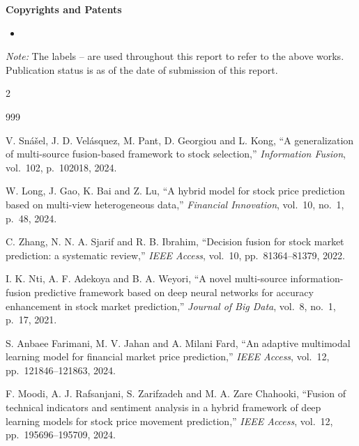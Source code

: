 \ifHasIPR
\textbf{Copyrights and Patents}

\begin{itemize}
\item \IPRentries
\end{itemize}
\fi

\vspace{0.4em}
\textit{Note:} The labels -- are used throughout this report to refer
to the above works. Publication status is as of the date of submission of this report.

\clearpage
\begin{footnotesize}
\setlength{\parskip}{0pt}
\setlength{\columnsep}{16pt}
\begin{multicols}{2}
\begin{thebibliography}{999}
\setlength{\itemsep}{1.5pt}\setlength{\parsep}{0pt}

 V. Sn\'a\v{s}el, J. D. Vel\'asquez, M. Pant, D. Georgiou and L. Kong,
``A generalization of multi-source fusion-based framework to stock selection,''
\emph{Information Fusion}, vol.~102, p.~102018, 2024.

 W. Long, J. Gao, K. Bai and Z. Lu, ``A hybrid model for stock price
prediction based on multi-view heterogeneous data,'' \emph{Financial Innovation}, vol.~10,
no.~1, p.~48, 2024.

 C. Zhang, N. N. A. Sjarif and R. B. Ibrahim, ``Decision fusion for
stock market prediction: a systematic review,'' \emph{IEEE Access}, vol.~10,
pp.~81364--81379, 2022.

 I. K. Nti, A. F. Adekoya and B. A. Weyori, ``A novel multi-source
information-fusion predictive framework based on deep neural networks for accuracy
enhancement in stock market prediction,'' \emph{Journal of Big Data}, vol.~8, no.~1, p.~17,
2021.

 S. Anbaee Farimani, M. V. Jahan and A. Milani Fard, ``An adaptive
multimodal learning model for financial market price prediction,'' \emph{IEEE Access},
vol.~12, pp.~121846--121863, 2024.

 F. Moodi, A. J. Rafsanjani, S. Zarifzadeh and M. A. Zare Chahooki,
``Fusion of technical indicators and sentiment analysis in a hybrid framework of deep
learning models for stock price movement prediction,'' \emph{IEEE Access}, vol.~12,
pp.~195696--195709, 2024.


\end{thebibliography}
\end{multicols}
\end{footnotesize}

